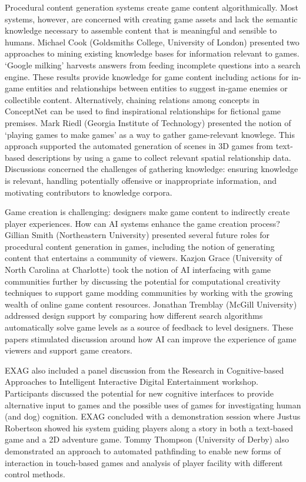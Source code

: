 \documentclass[10pt,a4paper]{article}
\begin{document}
Procedural content generation systems create game content algorithmically.
Most systems, however, are concerned with creating game assets and lack the semantic knowledge necessary to assemble content that is meaningful and sensible to humans.
Michael Cook (Goldsmiths College, University of London) presented two approaches to mining existing knowledge bases for information relevant to games.
`Google milking' harvests answers from feeding incomplete questions into a search engine.
These results provide knowledge for game content including actions for in-game entities and relationships between entities to suggest in-game enemies or collectible content.
Alternatively, chaining relations among concepts in ConceptNet can be used to find inspirational relationships for fictional game premises.
Mark Riedl (Georgia Institute of Technology) presented the notion of `playing games to make games' as a way to gather game-relevant knowlege.
This approach supported the automated generation of scenes in 3D games from text-based descriptions by using a game to collect relevant spatial relationship data.
Discussions concerned the challenges of gathering knowledge: ensuring knowledge is relevant, handling potentially offensive or inappropriate information, and motivating contributors to knowledge corpora.


Game creation is challenging: designers make game content to indirectly create player experiences.
How can AI systems enhance the game creation process?
Gillian Smith (Northeastern University) presented several future roles for procedural content generation in games, including the notion of generating content that entertains a community of viewers.
Kazjon Grace (University of North Carolina at Charlotte) took the notion of AI interfacing with game communities further by discussing the potential for computational creativity techniques to support game modding communities by working with the growing wealth of online game content resources.
Jonathan Tremblay (McGill University) addressed design support by comparing how different search algorithms automatically solve game levels as a source of feedback to level designers.
These papers stimulated discussion around how AI can improve the experience of game viewers and support game creators.


EXAG also included a panel discussion from the Research in Cognitive-based Approaches to Intelligent Interactive Digital Entertainment workshop.
Participants discussed the potential for new cognitive interfaces to provide alternative input to games and the possible uses of games for investigating human (and dog) cognition.
EXAG concluded with a demonstration session where Justus Robertson showed his system guiding players along a story in both a text-based game and a 2D adventure game.
Tommy Thompson (University of Derby) also demonstrated an approach to automated pathfinding to enable new forms of interaction in touch-based games and analysis of player facility with different control methods.
\end{document}
